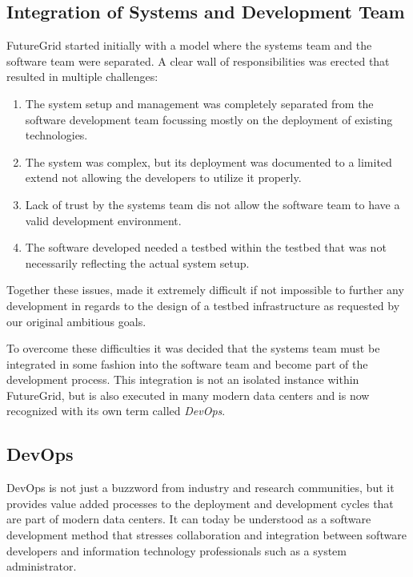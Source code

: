 \documentclass{article}
\begin{document}
\subsection{Integration of Systems and Development Team}

FutureGrid started initially with a model where the systems team and
the software team were separated. A clear wall of responsibilities was
erected that resulted in multiple challenges:

\begin{enumerate}

\item
The system setup and management was completely separated from
the software development team focussing mostly on the deployment of
existing technologies. 

\item
The system was complex, but its deployment was documented to a limited
extend not allowing the developers to utilize it properly.

\item 
Lack of trust by the systems team dis not allow the software team to
have a valid development environment.

\item
The software developed needed a testbed within the
testbed that was not necessarily reflecting the actual system setup.

\end{enumerate}

Together these issues, made it extremely difficult if not impossible to
further any development in regards to the design of a testbed
infrastructure as requested by our original ambitious goals. 

To overcome these difficulties it was decided that the systems team
must be integrated in some fashion into the software team and become
part of the development process. This integration is not an isolated
instance within FutureGrid, but is also executed in many modern data
centers and is now recognized with its own term called {\em DevOps}.

\subsection{DevOps}

DevOps is not just a buzzword from industry and research communities,
but it provides value added processes to the deployment and
development cycles that are part of modern data centers. It can today
be understood as a software development method that stresses
collaboration and integration between software developers and
information technology professionals such as a system administrator. 
\end{document}
